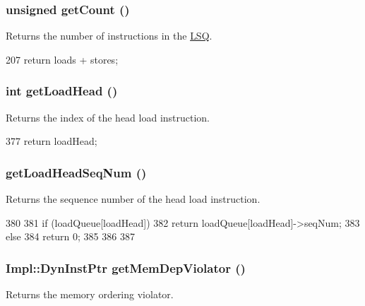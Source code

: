 \hypertarget{classOzoneLSQ_a24ba9cb3fa1e726321780a20a960c8cd}{
\subsubsection[{getCount}]{\setlength{\rightskip}{0pt plus 5cm}unsigned getCount ()}}
\label{classOzoneLSQ_a24ba9cb3fa1e726321780a20a960c8cd}
Returns the number of instructions in the \hyperlink{classLSQ}{LSQ}. 


\begin{DoxyCode}
207 { return loads + stores; }
\end{DoxyCode}
\hypertarget{classOzoneLSQ_ad43a7408f4e1c1e181bc40ecab6dc593}{
\subsubsection[{getLoadHead}]{\setlength{\rightskip}{0pt plus 5cm}int getLoadHead ()}}
\label{classOzoneLSQ_ad43a7408f4e1c1e181bc40ecab6dc593}
Returns the index of the head load instruction. 


\begin{DoxyCode}
377 { return loadHead; }
\end{DoxyCode}
\hypertarget{classOzoneLSQ_aee7352adadc6b43b7ce36a8c052eb222}{
\subsubsection[{getLoadHeadSeqNum}]{ getLoadHeadSeqNum ()}}
\label{classOzoneLSQ_aee7352adadc6b43b7ce36a8c052eb222}
Returns the sequence number of the head load instruction. 


\begin{DoxyCode}
380     {
381         if (loadQueue[loadHead]) {
382             return loadQueue[loadHead]->seqNum;
383         } else {
384             return 0;
385         }
386 
387     }
\end{DoxyCode}
\hypertarget{classOzoneLSQ_a30adaf6f5fb6b38b5747f35c419e3f31}{
\subsubsection[{getMemDepViolator}]{\setlength{\rightskip}{0pt plus 5cm}Impl::DynInstPtr getMemDepViolator ()}}
\label{classOzoneLSQ_a30adaf6f5fb6b38b5747f35c419e3f31}
Returns the memory ordering violator. 


